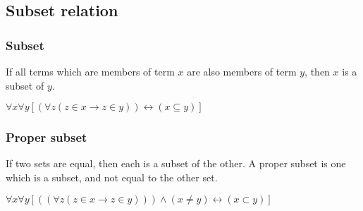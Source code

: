 
\subsection{Subset relation}

\subsubsection{Subset}

If all terms which are members of term \(x\) are also members of term \(y\), then \(x\) is a subset of \(y\).

$\forall x\forall y[(\forall z(z\in x\rightarrow z\in y))\leftrightarrow (x\subseteq y)]$

\subsubsection{Proper subset}

If two sets are equal, then each is a subset of the other. A proper subset is one which is a subset, and not equal to the other set.

$\forall x\forall y[((\forall z(z\in x\rightarrow z\in y)))\land(x\ne y)\leftrightarrow (x\subset y)]$

